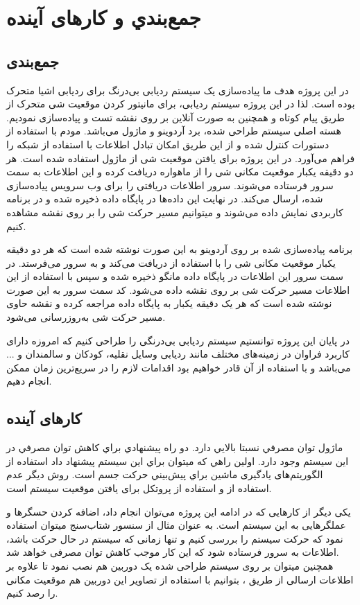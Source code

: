 \chapter{جمع‌بندي و کارهای آینده}
\section{جمع‌بندی}
در این پروژه هدف ما پیاده‌سازی یک سیستم ردیابی بی‌درنگ برای ردیابی اشیا متحرک بوده است.  لذا در این پروژه سیستم ردیابی، برای مانیتور کردن موقعیت شی متحرک از طریق پیام کوتاه و همچنین به صورت آنلاین بر روی نقشه تست و پیاده‌سازی نمودیم. هسته اصلی سیستم طراحی شده، برد آردوینو و ماژول  می‌باشد. مودم  با استفاده از دستورات  کنترل شده و از این طریق امکان تبادل اطلاعات با استفاده از شبکه  را فراهم می‌آورد. در این پروژه برای یافتن موقعیت شی از ماژول  استفاده شده است.  هر دو دقیقه یکبار موقعیت مکانی شی را از ماهواره دریافت کرده و این اطلاعات به سمت سرور فرستاده می‌شوند. سرور اطلاعات دریافتی را برای وب سرویس پیاده‌سازی شده، ارسال می‌کند. در نهایت این داده‌ها در پایگاه داده ذخیره شده و در برنامه کاربردی نمایش داده می‌شوند و میتوانیم مسیر حرکت شی را بر روی نقشه مشاهده کنیم.


برنامه پیاده‌سازی شده بر روی آردوینو به این صورت نوشته شده است که هر دو دقیقه یکبار موقعیت مکانی شی را با استفاده از  دریافت می‌کند و به سرور می‌فرستد. در سمت سرور  این اطلاعات در پایگاه داده مانگو ذخیره شده و سپس با استفاده از این اطلاعات مسیر حرکت شی بر روی نقشه داده می‌شود. کد سمت سرور به این صورت نوشته شده است که هر یک دقیقه یکبار به پایگاه داده مراجعه کرده و نقشه حاوی مسیر حرکت شی به‌روزرسانی می‌شود.


در پایان این پروژه توانستیم سیستم ردیابی بی‌درنگی را  طراحی کنیم که امروزه دارای کاربرد فراوان در زمینه‌های مختلف مانند ردیابی وسایل نقلیه، کودکان و سالمندان و ... می‌باشد و با استفاده از آن قادر خواهیم بود اقدامات لازم را در سریع‌ترین زمان ممکن انجام دهیم.
\section{کارهای آینده}
ماژول  توان مصرفي نسبتا بالايي دارد. دو راه پيشنهادي براي كاهش توان مصرفي در اين سيستم وجود دارد. اولين راهي كه ميتوان براي اين سيستم پيشنهاد داد استفاده از الگوريتم‌های يادگیری ماشین براي پيش‌بيني حركت جسم است. روش ديگر عدم استفاده از  و استفاده از پروتكل  برای یافتن موقعیت سیستم است.


یکی دیگر از کارهایی که در ادامه این پروژه می‌توان انجام داد، اضافه کردن حسگرها و عملگرهایی به این سیستم است. به عنوان مثال از سنسور شتاب‌سنج میتوان استفاده نمود که حرکت سیستم را بررسی کنیم و تنها زمانی که سیستم در حال حرکت باشد، اطلاعات  به سرور فرستاده شود که این کار موجب کاهش توان مصرفی خواهد شد.\\
همچنین میتوان بر روی سیستم طراحی شده یک دوربین هم نصب نمود تا علاوه بر اطلاعات ارسالی از طریق ، بتوانیم با استفاده از تصاویر این دوربین هم موقعیت مکانی  را رصد کنیم.


